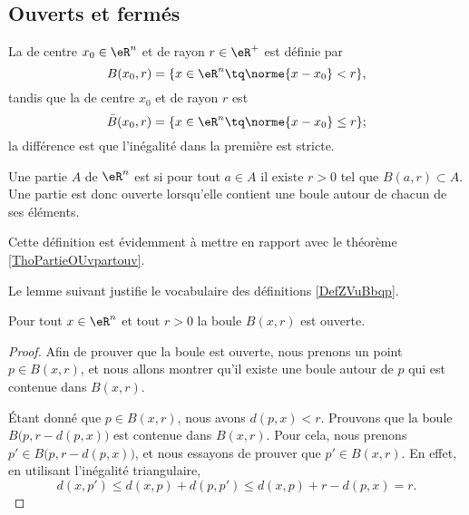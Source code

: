 					\subsection{Ouverts et fermés}

\begin{definition}  \label{DefZVuBbqp}
	La  de centre $x_0 \in \eR^n$ et de rayon $r \in
	\eR^+$ est définie par
	\begin{equation}
		B(x_0,r) = \{ x \in \eR^n \tq \norme{x - x_0} < r \},
	\end{equation}
	tandis que la  de centre $x_0$ et de rayon $r$ est
	\begin{equation}
		\bar B(x_0,r) = \{ x \in \eR^n \tq \norme{x - x_0} \leq r \};
	\end{equation}
	la différence est que l'inégalité dans la première est stricte.
\end{definition}

\begin{definition}  \label{DefUOyCQtW}
    Une partie \( A\) de \( \eR^n\) est  si pour tout \( a\in A\) il existe \( r>0\) tel que \( B(a,r)\subset A\). Une partie est donc ouverte lorsqu'elle contient une boule autour de chacun de ses éléments. 
\end{definition}
Cette définition est évidemment à mettre en rapport avec le théorème \ref{ThoPartieOUvpartouv}.

Le lemme suivant justifie le vocabulaire des définitions \ref{DefZVuBbqp}.
\begin{lemma}   \label{LemMESSExh}
    Pour tout $x \in \eR^n$ et tout $r >0$ la boule \( B(x,r)\) est ouverte.
\end{lemma}

\begin{proof}
    Afin de prouver que la boule est ouverte, nous prenons un point $p\in B(x,r)$, et nous allons montrer qu'il existe une boule autour de $p$ qui est contenue dans $B(x,r)$.

    Étant donné que $p\in B(x,r)$, nous avons $d(p,x)<r$. Prouvons que la boule $B\big(p,r-d(p,x)\big)$ est contenue dans $B(x,r)$. Pour cela, nous prenons $p'\in B\big(p,r-d(p,x)\big)$, et nous essayons de prouver que $p'\in B(x,r)$. En effet, en utilisant l'inégalité triangulaire,
    \begin{equation}
	    d(x,p')\leq d(x,p)+d(p,p')\leq d(x,p)+r-d(p,x)=r.
    \end{equation}
\end{proof}

